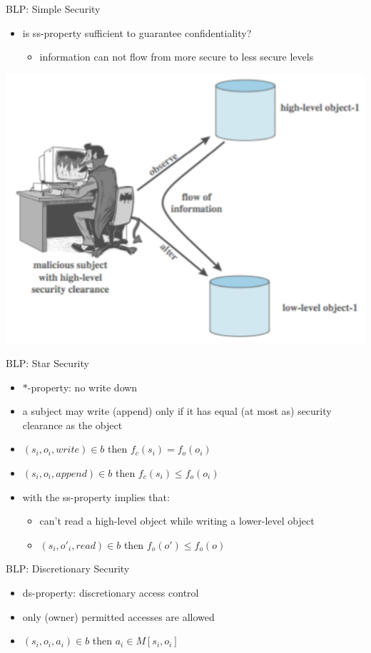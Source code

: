 \documentclass{beamer}
\begin{document}
\begin{frame}{BLP: Simple Security}
  \begin{itemize}
  \item is ss-property sufficient to guarantee confidentiality?
    \begin{itemize}
    \item<2-> information can not flow from more secure to 
      less secure levels
    \end{itemize}
  \end{itemize}
   {
  \begin{center}
    \includegraphics[width=0.5\linewidth]{mlisious_writer}
  \end{center}
  }
\end{frame}

\begin{frame}{BLP: Star Security}
  \begin{itemize}
  \item $*$-property: no write down
  \item a subject may write (append) only if it has equal (at most as)  security
    clearance as the object
  \item $(s_i, o_i, write) \in b$ then
    $f_c(s_i) = f_o(o_i)$
  \item $(s_i, o_i, append) \in b$ then
    $f_c(s_i) \leq f_o(o_i)$
  \item with the ss-property implies that:
    \begin{itemize}
      \item can't read a high-level object while writing a lower-level
        object
      \item $(s_i, o'_i, read) \in b$ then
        $f_o(o') \leq f_o(o)$
    \end{itemize}
  \end{itemize}
\end{frame}

\begin{frame}{BLP: Discretionary Security}
  \begin{itemize}
  \item ds-property: discretionary access control
  \item only (owner) permitted accesses are allowed
  \item $(s_i, o_i, a_i) \in b$ then
    $a_i \in M[s_i, o_i]$
  \end{itemize}
\end{frame}
\end{document}
